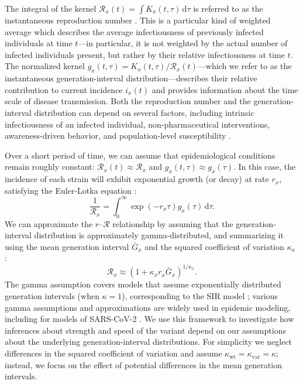 \documentclass[12pt]{article}
\newcommand{\RR}{\ensuremath{{\mathcal R}}\xspace}
\newcommand{\dd}[1]{\ensuremath{\, \mathrm{d}#1}}
\newcommand{\dtau}{\dd{\tau}}
\begin{document}
The integral of the kernel $\RR_x(t) = \int K_x(t, \tau) \dtau$ is referred to as the instantaneous reproduction number \citep{fraser2007estimating}.
This is a particular kind of weighted average which describes the average infectiousness of previously infected individuals at time $t$---in particular, it is not weighted by the actual number of infected individuals present, but rather by their relative infectiousness at time $t$.
The normalized kernel $g_x(t, \tau) = K_x(t, \tau)/\RR_x(t)$---which we refer to as the instantaneous generation-interval distribution---describes their relative contribution to current incidence $i_x(t)$ and provides information about the time scale of disease transmission.
Both the reproduction number and the generation-interval distribution can depend on several factors, including intrinsic infectiousness of an infected individual, non-pharmaceutical interventions, awareness-driven behavior, and population-level susceptibility \citep{fraser2007estimating}.

Over a short period of time, we can assume that epidemiological conditions remain roughly constant: $\RR_x(t) \approx \RR_x$ and $g_x(t, \tau) \approx g_x(\tau)$.
In this case, the incidence of each strain will exhibit exponential growth (or decay) at rate $r_x$, satisfying the Euler-Lotka equation \citep{wallinga2007generation}:
\begin{equation}
\frac{1}{\RR_x} = \int_0^\infty \exp(- r_x \tau) g_x(\tau) \dtau.
\end{equation}
We can approximate the $r$--$\RR$ relationship by assuming that the generation-interval distribution is approximately gamma-distributed, and summarizing it using the mean generation interval $\bar{G}_x$ and the squared coefficient of variation $\kappa_x$ \citep{park2019practical}:
\begin{equation}
\RR_x \approx (1 + \kappa_x r_x \bar{G}_x)^{1/\kappa_x}.
\end{equation}
The gamma assumption covers models that assume exponentially distributed generation intervals (when $\kappa=1$), corresponding to the SIR model \citep{anderson1991infectious}; various gamma assumptions and approximations are widely used in epidemic modeling, including for models of SARS-CoV-2 \citep{doi:10.1098/rsif.2020.0144}.
We use this framework to investigate how inferences about strength and speed of the variant depend on our assumptions about the underlying generation-interval distributions.
For simplicity we neglect differences in the squared coefficient of variation and assume $\kappa_{\mathrm{wt}} = \kappa_{\mathrm{var}} = \kappa$; instead, we focus on the effect of potential differences in the mean generation intervals.
\end{document}
